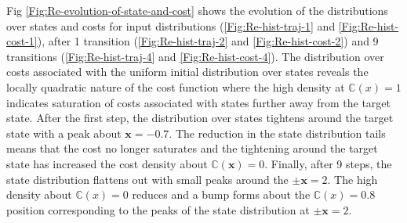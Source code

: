 Fig \ref{Fig:Re-evolution-of-state-and-cost} shows the evolution of the distributions over states and costs for input distributions (\ref{Fig:Re-hist-traj-1} and \ref{Fig:Re-hist-cost-1}), after 1 transition (\ref{Fig:Re-hist-traj-2} and \ref{Fig:Re-hist-cost-2}) and 9 transitions (\ref{Fig:Re-hist-traj-4} and \ref{Fig:Re-hist-cost-4}). The distribution over costs associated with the uniform initial distribution over states reveals the locally quadratic nature of the cost function where the high density at $\mathbb{C}(x)=1$ indicates saturation of costs associated with states further away from the target state. After the first step, the distribution over states tightens around the target state with a peak about $\mathbf{x}=-0.7$. The reduction in the state distribution tails means that the cost no longer saturates and the tightening around the target state has increased the cost density about $\mathbb{C}(\mathbf{x})=0$. Finally, after 9 steps, the state distribution flattens out with small peaks around the $\pm\mathbf{x}=2$. The high density about $\mathbb{C}(x)=0$ reduces and a bump forms about the $\mathbb{C}(x)=0.8$ position corresponding to the peaks of the state distribution at $\pm\mathbf{x}=2$. 

